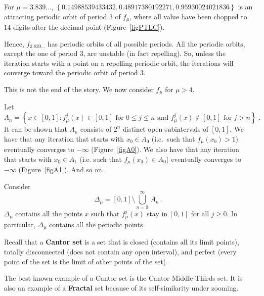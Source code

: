 \begin{egg}
For $\mu = 3.839\ldots$,
$\left\{0.14988539433432, 0.48917380192271, 0.95930024021836 \right\}$
is an attracting periodic orbit of period $3$ of $f_\mu$, where all
value have been chopped to $14$ digits after the decimal point
(Figure~\ref{figPTLC}).


Hence, $f_{3.839\ldots}$ has periodic orbits of all possible periods.
All the periodic orbits, except the one of period $3$, are unstable
(in fact repelling).  So, unless the iteration starts with a point on
a repelling periodic orbit, the iterations will converge toward the
periodic orbit of period $3$.
\end{egg}

This is not the end of the story.  We now consider $f_\mu$ for
$\mu>4$.

Let
\[
A_n = \left\{ x \in [0,1] : f_\mu^j(x) \in [0,1] \text{ for }
0 \leq j \leq n \text{ and } f_\mu^j(x) \not\in [0,1] \text{ for }
j > n \right\} \; .
\]
It can be shown that $A_n$ consists of $2^n$ distinct open subintervals
of $[0,1]$.  We have that any iteration that starts with $x_0 \in A_0$
(i.e.\ such that $f_\mu(x_0)>1$) eventually converges to $-\infty$
(Figure~\ref{figA0}).  We also have that any iteration that starts
with $x_0 \in A_1$ (i.e. such that $f_\mu(x_0) \in A_0$) eventually
converges to $-\infty$ (Figure~\ref{figA1}).  And so on.



Consider
\[
\Delta_\mu = [0,1] \setminus \bigcup_{n=0}^\infty \,A_n \; .
\]
$\Delta_\mu$ contains all the points $x$ such that $f_\mu^j(x)$ stay
in $[0,1]$ for all $j\geq 0$.  In particular, $\Delta_\mu$ contains all
the periodic points.

Recall that a {\bfseries Cantor set} is a set that
is closed (contains
all its limit points), totally disconnected (does not contain any open
interval), and perfect (every point of the set is the limit of other
points of the set).

\begin{egg}
The best known example of a Cantor set is the Cantor Middle-Thirds
set.  It is also an example of a
{\bfseries Fractal} set because of its
self-similarity under zooming.
\end{egg}

